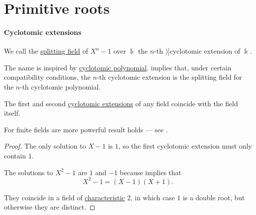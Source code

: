 \section{Primitive roots}\label{sec:primitive_elements}

\paragraph{Cyclotomic extensions}

\begin{definition}\label{def:cyclotomic_extension}
  We call the \hyperref[def:splitting_field]{splitting field} of \( X^n - 1 \) over \( \Bbbk \) the \( n \)-th \term[ru=круговое / циклотомическое (поле разложения) (\cite[204]{Кострикин2001АлгебраЧасть3})]{cyclotomic extension} of \( \Bbbk \).
\end{definition}
\begin{comments}
  \item The name is inspired by \hyperref[def:cyclotomic_polynomial]{cyclotomic polynomial}.  implies that, under certain compatibility conditions, the \( n \)-th cyclotomic extension is the splitting field for the \( n \)-th cyclotomic polynomial.
\end{comments}

\begin{proposition}\label{thm:small_cyclotomic_extensions}
  The first and second \hyperref[def:cyclotomic_extension]{cyclotomic extensions} of any field coincide with the field itself.
\end{proposition}
\begin{comments}
  \item For finite fields are more powerful result holds --- see .
\end{comments}
\begin{proof}
  The only solution to \( X - 1 \) is \( 1 \), so the first cyclotomic extension must only contain \( 1 \).

  The solutions to \( X^2 - 1 \) are \( 1 \) and \( -1 \) because  implies that
  \begin{equation*}
    X^2 - 1 = (X - 1)(X + 1).
  \end{equation*}

  They coincide in a field of \hyperref[def:ring_characteristic]{characteristic} \( 2 \), in which case \( 1 \) is a double root, but otherwise they are distinct.
\end{proof}

